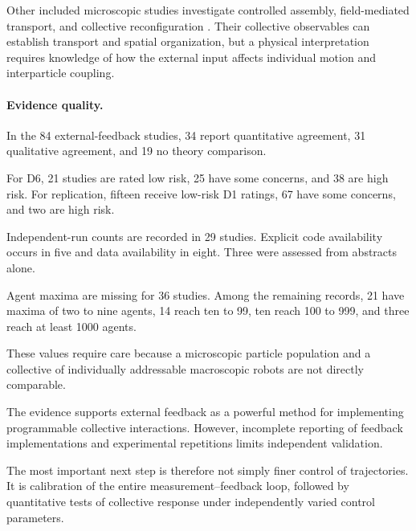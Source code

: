 Other included microscopic studies
investigate controlled assembly,
field-mediated transport,
and collective reconfiguration
\cite{Gardi2022microrobotcollectiv,Alapan2019shapeencodeddynami,Wang2018collectivebehavior,Ji2021ondemandassemblya,An2024modelfreecontrolo,Fan2023largescaleswarmco,Xie2019programmablegenerat,Wang2022reconfigurablemagne,Wang2022magneticactuationo,Law2024navigationofmagnet,Yang2019statisticsbasedaut,Yu2022adaptivepatternand,Yu2019reconfigurablecollo,Wang2021precisecontrolofm,Ceron2026fluidictorqueenabl,Dong2020controllingtwodime,Dong2019collectiveformation,Li2022vectorcontrolledwh}.
Their collective observables can establish
transport and spatial organization,
but a physical interpretation requires
knowledge of how the external input
affects individual motion and
interparticle coupling.

\paragraph*{Evidence quality.}

In the 84 external-feedback studies,
34 report quantitative agreement,
31 qualitative agreement, and
19 no theory comparison.

For D6, 21 studies are rated
low risk, 25 have some concerns,
and 38 are high risk.
For replication, fifteen
receive low-risk D1 ratings,
67 have some concerns,
and two are high risk.

Independent-run counts are
recorded in 29 studies.
Explicit code availability
occurs in five and data
availability in eight.
Three were assessed
from abstracts alone.

Agent maxima are missing
for 36 studies. Among the
remaining records,
21 have maxima of two
to nine agents,
14 reach ten to 99,
ten reach 100 to 999,
and three reach at least
1000 agents.

These values require care
because a microscopic
particle population and
a collective of individually
addressable macroscopic
robots are not directly
comparable.

The evidence supports
external feedback as a
powerful method for
implementing programmable
collective interactions.
However, incomplete
reporting of feedback
implementations and
experimental repetitions
limits independent
validation.

The most important
next step is therefore
not simply finer
control of trajectories.
It is calibration
of the entire
measurement--feedback
loop, followed by
quantitative tests
of collective response
under independently
varied control
parameters.

